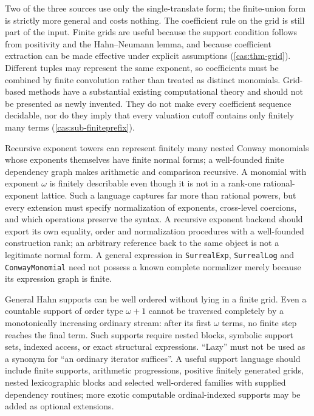 \documentclass[11pt,letterpaper]{article}
\numberwithin{equation}{section}
\theoremstyle{definition}
\theoremstyle{remark}
\begin{document}
Two of the three sources use only the single-translate form; the finite-union
form is strictly more general and costs nothing. The coefficient rule on the
grid is still part of the input. Finite grids are useful because the support
condition follows from positivity and the Hahn--Neumann lemma, and because
coefficient extraction can be made effective under explicit assumptions
(\cref{cas:thm-grid}). Different tuples may represent the same exponent, so
coefficients must be combined by finite convolution rather than treated as
distinct monomials. Grid-based methods have a substantial existing computational
theory \cite{cas:vdH} and should not be presented as newly invented. They do not
make every coefficient sequence decidable, nor do they imply that every
valuation cutoff contains only finitely many terms
(\cref{cas:sub-finiteprefix}).

Recursive exponent towers can represent finitely many nested Conway monomials
whose exponents themselves have finite normal forms; a well-founded finite
dependency graph makes arithmetic and comparison recursive. A monomial with
exponent $\omega$ is finitely describable even though it is not in a rank-one
rational-exponent lattice. Such a language captures far more than rational
powers, but every extension must specify normalization of exponents, cross-level
coercions, and which operations preserve the syntax. A recursive exponent
backend should export its own equality, order and normalization procedures with
a well-founded construction rank; an arbitrary reference back to the same object
is not a legitimate normal form. A general expression in \texttt{SurrealExp},
\texttt{SurrealLog} and \texttt{ConwayMonomial} need not possess a known
complete normalizer merely because its expression graph is finite.

General Hahn supports can be well ordered without lying in a finite grid. Even a
countable support of order type $\omega+1$ cannot be traversed completely by a
monotonically increasing ordinary stream: after its first $\omega$ terms, no
finite step reaches the final term. Such supports require nested blocks,
symbolic support sets, indexed access, or exact structural expressions.
``Lazy'' must not be used as a synonym for ``an ordinary iterator suffices''.
A useful support language should include finite supports, arithmetic
progressions, positive finitely generated grids, nested lexicographic blocks and
selected well-ordered families with supplied dependency routines; more exotic
computable ordinal-indexed supports may be added as optional extensions.
\end{document}
